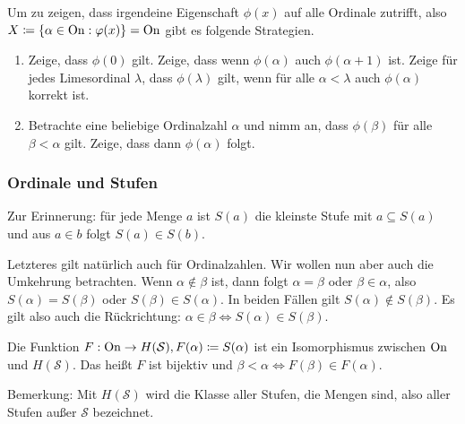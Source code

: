 Um zu zeigen, dass irgendeine Eigenschaft $\phi(x)$ auf alle Ordinale zutrifft, also $X\coloneqq\{\alpha\in \operatorname{On} : \varphi(x)\}=\operatorname{On}$ gibt es folgende Strategien.
\begin{enumerate}
	\item Zeige, dass $\phi(0)$ gilt. Zeige, dass wenn $\phi(\alpha)$ auch $\phi(\alpha+1)$ ist. Zeige für jedes Limesordinal $\lambda$, dass $\phi(\lambda)$ gilt, wenn für alle $\alpha<\lambda$ auch $\phi(\alpha)$ korrekt ist.
	
	\item Betrachte eine beliebige Ordinalzahl $\alpha$ und nimm an, dass $\phi(\beta)$ für alle $\beta<\alpha$ gilt. Zeige, dass dann $\phi(\alpha)$ folgt.
\end{enumerate}

\subsubsection{Ordinale und Stufen}

Zur Erinnerung: für jede Menge $a$ ist $S(a)$ die kleinste Stufe mit $a\subseteq S(a)$ und aus $a\in b$ folgt $S(a)\in S(b)$.

Letzteres gilt natürlich auch für Ordinalzahlen. Wir wollen nun aber auch die Umkehrung betrachten. Wenn $\alpha\notin\beta$ ist, dann folgt $\alpha=\beta$ oder $\beta\in\alpha$, also $S(\alpha)=S(\beta)$ oder $S(\beta)\in S(\alpha)$. In beiden Fällen gilt $S(\alpha)\notin S(\beta)$. Es gilt also auch die Rückrichtung: $\alpha\in\beta \Leftrightarrow S(\alpha)\in S(\beta)$.

\begin{satz}
	Die Funktion $F:\operatorname{On} \to H(\mathcal{S}), F(\alpha)\coloneqq S(\alpha)$ ist ein Isomorphismus zwischen $\operatorname{On}$ und $H(\mathcal{S})$. Das heißt $F$ ist bijektiv und $\beta<\alpha \Leftrightarrow F(\beta)\in F(\alpha)$.
\end{satz}

Bemerkung: Mit $H(\mathcal{S})$ wird die Klasse aller Stufen, die Mengen sind, also aller Stufen außer $\mathcal{S}$ bezeichnet.

